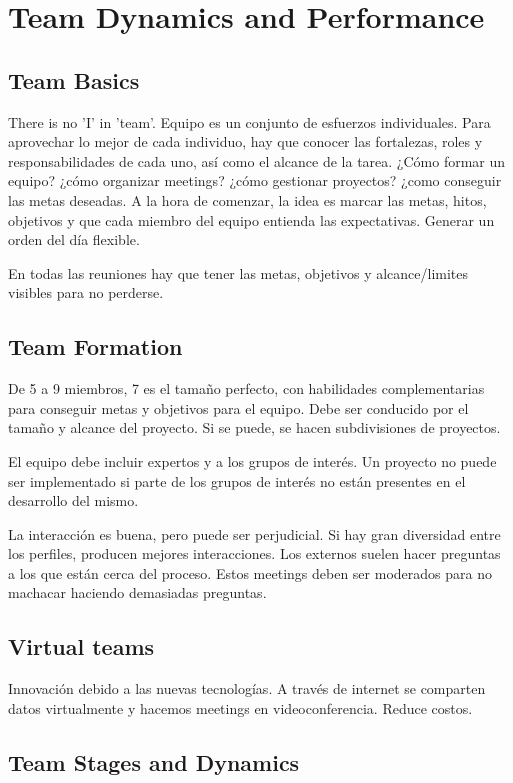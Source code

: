 \documentclass[]{article}
\begin{document}
\section{Team Dynamics and Performance}
\subsection{Team Basics}

There is no 'I' in 'team'. Equipo es un conjunto de esfuerzos individuales. Para aprovechar lo mejor de cada individuo, hay que conocer las fortalezas, roles y responsabilidades de cada uno, así como el alcance de la tarea. ¿Cómo formar un equipo? ¿cómo organizar meetings? ¿cómo gestionar proyectos? ¿como conseguir las metas deseadas. A la hora de comenzar, la idea es marcar las metas, hitos, objetivos y que cada miembro del equipo entienda las expectativas. Generar un orden del día flexible.

En todas las reuniones hay que tener las metas, objetivos y alcance/limites visibles para no perderse.

\subsection{Team Formation}

De 5 a 9 miembros, 7 es el tamaño perfecto, con habilidades complementarias para conseguir metas y objetivos para el equipo. Debe ser conducido por el tamaño y alcance del proyecto. Si se puede, se hacen subdivisiones de proyectos.

El equipo debe incluir expertos y a los grupos de interés. Un proyecto no puede ser implementado si parte de los grupos de interés no están presentes en el desarrollo del mismo.

La interacción es buena, pero puede ser perjudicial. Si hay gran diversidad entre los perfiles, producen mejores interacciones. Los externos suelen hacer preguntas a los que están cerca del proceso. Estos meetings deben ser moderados para no machacar haciendo demasiadas preguntas.

\subsection{Virtual teams}

Innovación debido a las nuevas tecnologías. A través de internet se comparten datos virtualmente y hacemos meetings en videoconferencia. Reduce costos.

\subsection{Team Stages and Dynamics}
\end{document}
